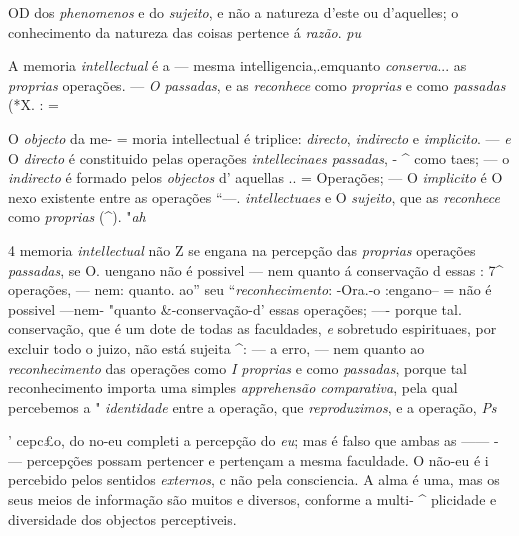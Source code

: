 OD dos \emph{phenomenos} e do \emph{sujeito}, e não a natureza d'este ou d'aquelles; o conhecimento da natureza das coisas pertence á \emph{razão}. \emph{pu}


 
A memoria \emph{intellectual} é a --- mesma intelligencia,.emquanto \emph{conserva}... as \emph{proprias} operações. --- \emph{O passadas}, e as \emph{reconhece} como \emph{proprias} e como \emph{passadas} (*X. : =


O \emph{objecto} da me- = moria intellectual é triplice: \emph{directo}, \emph{indirecto} e \emph{implicito}. --- \emph{e} O \emph{directo} é constituido pelas operações \emph{intellecinaes passadas}, - \textasciicircum{} como taes; --- o \emph{indirecto} é formado pelos \emph{objectos} d' aquellas .. = Operações; --- O \emph{implicito} é O nexo existente entre as operações “---. \emph{intellectuaes} e O \emph{sujeito}, que as \emph{reconhece} como \emph{proprias} (\textasciicircum{}). "\emph{ah}


4 memoria \emph{intellectual} não Z se engana na percepção das \emph{proprias} operações \emph{passadas}, se O. uengano não é possivel --- nem quanto á conservação d essas : 7\textasciicircum{} operações, --- nem: quanto. ao” seu “\emph{reconhecimento}: -Ora.-o :engano-- = não é possivel ---nem- "quanto \&-conservação-d' essas operações; ---- porque tal. conservação, que é um dote de todas as faculdades, \emph{e} sobretudo espirituaes, por excluir todo o juizo, não está sujeita \textasciicircum{}: --- a erro, --- nem quanto ao \emph{reconhecimento} das operações como \emph{I proprias} e como \emph{passadas}, porque tal reconhecimento importa uma simples \emph{apprehensão comparativa}, pela qual percebemos a " \emph{identidade} entre a operação, que \emph{reproduzimos}, e a operação, \emph{Ps}

' cepc£o, do no-eu completi a percepção do \emph{eu}; mas é falso que ambas as ------ - --- percepções possam pertencer e pertençam a mesma faculdade. O não-eu é i percebido pelos sentidos \emph{externos}, c não pela consciencia. A alma é uma, mas os seus meios de informação são muitos e diversos, conforme a multi- \textasciicircum{} plicidade e diversidade dos objectos perceptiveis.


